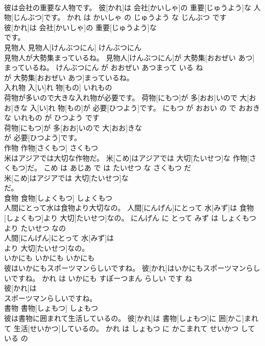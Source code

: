 \documentclass[8pt]{extreport}
\begin{document}
\begin{CJK}{UTF8}{min}
\\	彼は会社の重要な人物です。	彼[かれ]は 会社[かいしゃ]の 重要[じゅうよう]な 人物[じんぶつ]です。	かれ は かいしゃ の じゅうよう な じんぶつ です	
\\	彼[かれ]は 会社[かいしゃ]の 重要[じゅうよう]な
\\	です。			
\\	見物人	見物人[けんぶつにん]	けんぶつにん	
\\	見物人が大勢集まっているね。	見物人[けんぶつにん]が 大勢集[おおぜい あつ]まっているね。	けんぶつにん が おおぜい あつまって いる ね	
\\	が 大勢集[おおぜい あつ]まっているね。			
\\	入れ物	入[い]れ 物[もの]	いれもの	
\\	荷物が多いので大きな入れ物が必要です。	荷物[にもつ]が 多[おお]いので 大[おお]きな 入[い]れ 物[もの]が 必要[ひつよう]です。	にもつ が おおい の で おおき な いれもの が ひつよう です	
\\	荷物[にもつ]が 多[おお]いので 大[おお]きな
\\	が 必要[ひつよう]です。			
\\	作物	作物[さくもつ]	さくもつ	
\\	米はアジアでは大切な作物だ。	米[こめ]はアジアでは 大切[たいせつ]な 作物[さくもつ]だ。	こめ は あじあ で は たいせつ な さくもつ だ	
\\	米[こめ]はアジアでは 大切[たいせつ]な
\\	だ。			
\\	食物	食物[しょくもつ]	しょくもつ	
\\	人間にとって水は食物より大切なの。	人間[にんげん]にとって 水[みず]は 食物[しょくもつ]より 大切[たいせつ]なの。	にんげん に とって みず は しょくもつ より たいせつ なの	
\\	人間[にんげん]にとって 水[みず]は
\\	より 大切[たいせつ]なの。			
\\	いかにも	いかにも	いかにも	
\\	彼はいかにもスポーツマンらしいですね。	彼[かれ]はいかにもスポーツマンらしいですね。	かれ は いかにも すぽーつまん らしい です ね	
\\	彼[かれ]は
\\	スポーツマンらしいですね。			
\\	書物	書物[しょもつ]	しょもつ	
\\	彼は書物に囲まれて生活しているの。	彼[かれ]は 書物[しょもつ]に 囲[かこ]まれて 生活[せいかつ]しているの。	かれ は しょもつ に かこまれて せいかつ して いる の	

\end{CJK}
\end{document}
